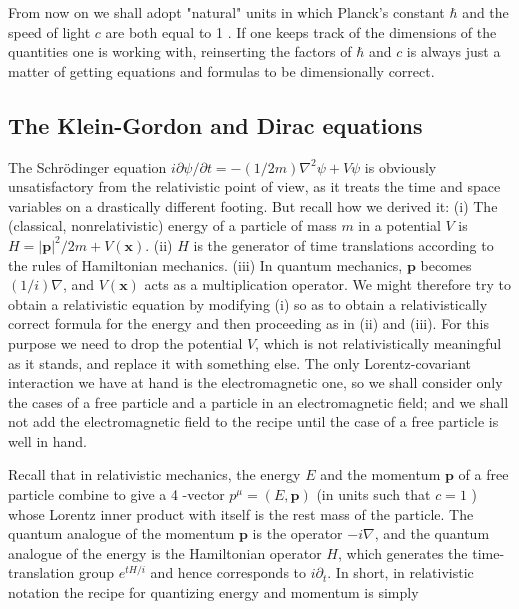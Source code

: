 \documentclass[10pt, letterpaper]{article}
\begin{document}
From now on we shall adopt "natural" units in which Planck's constant $\hbar$ and the speed of light $c$ are both equal to 1 . If one keeps track of the dimensions of the quantities one is working with, reinserting the factors of $\hbar$ and $c$ is always just a matter of getting equations and formulas to be dimensionally correct.

\subsection*{The Klein-Gordon and Dirac equations}
The Schrödinger equation $i \partial \psi / \partial t=-(1 / 2 m) \nabla^{2} \psi+V \psi$ is obviously unsatisfactory from the relativistic point of view, as it treats the time and space variables on a drastically different footing. But recall how we derived it: (i) The (classical, nonrelativistic) energy of a particle of mass $m$ in a potential $V$ is $H=|\mathbf{p}|^{2} / 2 m+V(\mathbf{x})$. (ii) $H$ is the generator of time translations according to the rules of Hamiltonian mechanics. (iii) In quantum mechanics, $\mathbf{p}$ becomes $(1 / i) \nabla$, and $V(\mathbf{x})$ acts as a multiplication operator. We might therefore try to obtain a relativistic equation by modifying (i) so as to obtain a relativistically correct formula for the energy and then proceeding as in (ii) and (iii). For this purpose we need to drop the potential $V$, which is not relativistically meaningful as it stands, and replace it with something else. The only Lorentz-covariant interaction we have at hand is the electromagnetic one, so we shall consider only the cases of a free particle and a particle in an electromagnetic field; and we shall not add the electromagnetic field to the recipe until the case of a free particle is well in hand.

Recall that in relativistic mechanics, the energy $E$ and the momentum $\mathbf{p}$ of a free particle combine to give a 4 -vector $p^{\mu}=(E, \mathbf{p})$ (in units such that $c=1$ ) whose Lorentz inner product with itself is the rest mass of the particle. The quantum analogue of the momentum $\mathbf{p}$ is the operator $-i \nabla$, and the quantum analogue of the energy is the Hamiltonian operator $H$, which generates the time-translation group $e^{t H / i}$ and hence corresponds to $i \partial_{t}$. In short, in relativistic notation the recipe for quantizing energy and momentum is simply
\end{document}
